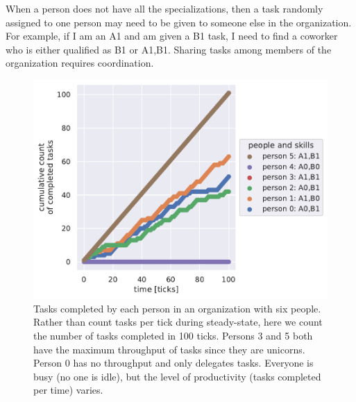 When a person does not have all the specializations, then a task randomly assigned to one person may need to be given to someone else in the organization. For example, if I am an A1 and am given a B1 task, I need to find a coworker who is either qualified as B1 or A1,B1. Sharing tasks among members of the organization requires coordination.




\begin{figure}[H] %
\centering
\includegraphics[width=1\textwidth]{images/task_distribution_tasks_per_person_simCount1_skills2_levels1_taskduration1_people6_social0_ticks100.pdf}
\caption{Tasks completed by each person in an organization with six people. Rather than count tasks per tick during steady-state, here we count the number of tasks completed in 100 ticks. Persons 3 and 5 both have the maximum throughput of tasks since they are unicorns. Person 0 has no throughput and only delegates tasks. Everyone is busy (no one is idle), but the level of productivity (tasks completed per time) varies.}
\label{fig:task-distribution-tasks-per-person}
\end{figure}



